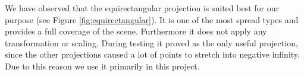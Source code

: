 We have observed that the equirectangular projection is suited best for our purpose (see Figure \ref{fig:equirectangular}). It is one of the most spread types and provides a full coverage of the scene. Furthermore it does not apply any transformation or scaling. During testing it proved as the only useful projection, since the other projections caused a lot of points to stretch into negative infinity. Due to this reason we use it primarily in this project.
